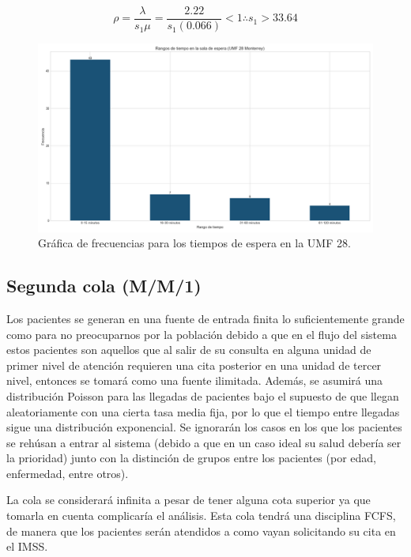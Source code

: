 \documentclass[10pt]{article}
\begin{document}
    \begin{equation*}
    	\rho = \frac{\lambda}{s_{1}\mu} = \frac{2.22}{s_{1}(0.066)} < 1
    	\therefore s_{1} > 33.64
    \end{equation*}
    
    \begin{figure}[h]
    	\centering
    	\includegraphics[width=\linewidth]{./images/rangos-tiempo-espera-umf28.png}
    	\caption{Gráfica de frecuencias para los tiempos de espera en la UMF 28.}
    	\label{fig:frec_espera_umf28}
    \end{figure}
    
    \newpage
    
    \subsection{Segunda cola (M/M/1)}
    Los pacientes se generan en una fuente de entrada finita lo suficientemente grande como para no preocuparnos por la población debido a que en el flujo del sistema estos pacientes son aquellos que al salir de su consulta en alguna unidad de primer nivel de atención requieren una cita posterior en una unidad de tercer nivel, entonces se tomará como una fuente ilimitada. Además, se asumirá una distribución Poisson para las llegadas de pacientes bajo el supuesto de que llegan aleatoriamente con una cierta tasa media fija, por lo que el tiempo entre llegadas sigue una distribución exponencial. Se ignorarán los casos en los que los pacientes se rehúsan a entrar al sistema (debido a que en un caso ideal su salud debería ser la prioridad) junto con la distinción de grupos entre los pacientes (por edad, enfermedad, entre otros).
    
    La cola se considerará infinita a pesar de tener alguna cota superior ya que tomarla en cuenta complicaría el análisis. Esta cola tendrá una disciplina FCFS, de manera que los pacientes serán atendidos a como vayan solicitando su cita en el IMSS.
    
\end{document}
